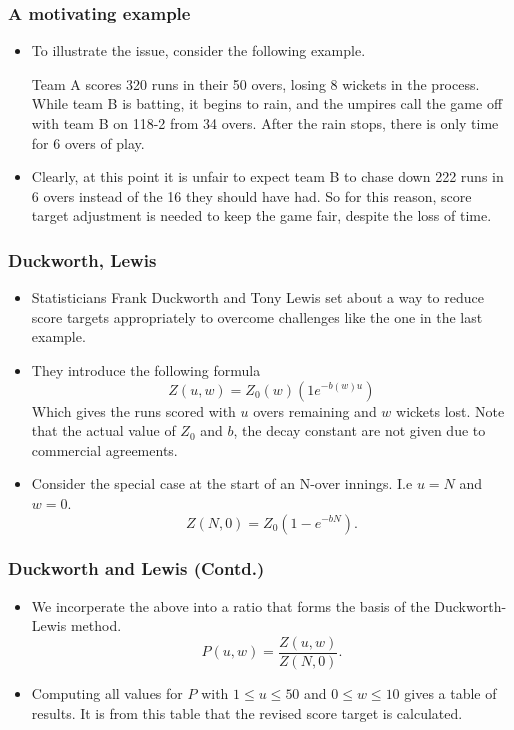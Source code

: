 \documentclass{beamer}
\begin{document}
\begin{frame}
    \frametitle{A motivating example}
    \begin{itemize}
        \item To illustrate the issue, consider the following example. \\
        \pause
        \begin{example}
            Team A scores 320 runs in their 50 overs, losing 8 wickets in the process. While team B is batting, 
            it begins to rain, and the umpires call the game off with team B on 118-2 from 34 overs. After the rain stops,
            there is only time for 6 overs of play. 
        \end{example}
        \pause    
        \item Clearly, at this point it is unfair to expect team B to chase down 222 runs in 6 overs instead of the 16 they should 
            have had. So for this reason, score target adjustment is needed to keep the game fair, despite the loss of time.
\end{itemize}
        
\end{frame}

\begin{frame}
\frametitle{Duckworth, Lewis}

\begin{itemize}
    \item Statisticians Frank Duckworth and Tony Lewis set about a way to reduce score targets appropriately to overcome challenges
        like the one in the last example. \\
    \pause
    \item They introduce the following formula
        $$
            Z(u,w) =  Z_0(w)(1e^{-b(w)u})
        $$ 
        Which gives the runs scored with $u$ overs remaining and $w$ wickets lost. Note that the actual value of $Z_0$ and $b$, the decay constant are not given due to commercial agreements.
    \pause
    \item Consider the special case at the start of an N-over innings. I.e $u=N$ and $w=0$.
         $$
            Z(N,0) = Z_0(1 - e^{-bN})
        .$$

\end{itemize}

\end{frame}

\begin{frame}
    \frametitle{Duckworth and Lewis (Contd.)}
    \begin{itemize}
     \item We incorperate the above into a ratio that forms the basis of the Duckworth-Lewis method.
        $$
            P(u,w) = \frac{Z(u,w)}{Z(N,0)}
        .$$ 
    \pause
    \item Computing all values for $P$ with $1 \leq u \leq 50$ and $0 \leq w \leq 10$ gives a table of results.
        It is from this table that the revised score target is calculated. 
    \end{itemize}
\end{frame}
\end{document}
